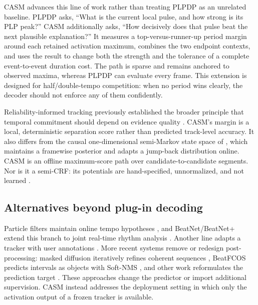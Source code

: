 \documentclass{article}
\begin{document}
CASM advances this line of work rather than treating PLPDP as an unrelated
baseline. PLPDP asks, ``What is the current local pulse, and how strong is its
PLP peak?'' CASM additionally asks, ``How decisively does that pulse beat the
next plausible explanation?'' It measures a top-versus-runner-up period margin
around each retained activation maximum, combines the two endpoint contexts,
and uses the result to change both the strength and the tolerance of a complete
event-to-event duration cost. The path is sparse and remains anchored to
observed maxima, whereas PLPDP can evaluate every frame. This extension is
designed for half/double-tempo competition: when no period wins clearly, the
decoder should not enforce any of them confidently.

Reliability-informed tracking previously established the broader principle
that temporal commitment should depend on evidence quality
\cite{degara2012reliability}. CASM's margin is a local, deterministic separation
score rather than predicted track-level accuracy. It also differs from the
causal one-dimensional semi-Markov state space of \cite{heydari2022semimarkov},
which maintains a framewise posterior and adapts a jump-back distribution
online. CASM is an offline maximum-score path over candidate-to-candidate
segments. Nor is it a semi-CRF: its potentials are hand-specified, unnormalized,
and not learned \cite{sarawagi2004semimarkov}.

\subsection{Alternatives beyond plug-in decoding}

Particle filters maintain online tempo hypotheses \cite{hainsworth2004particle},
and BeatNet/BeatNet+ extend this branch to joint real-time rhythm analysis
\cite{heydari2021beatnet,heydari2024beatnetplus}. Another line adapts a tracker
with user annotations \cite{pinto2021userdriven,maia2022adapting,
pinto2023bridging,maia2024selective,pinto2026challenging}. More recent systems
remove or redesign post-processing: masked diffusion iteratively refines
coherent sequences \cite{foscarin2026masked}, BeatFCOS predicts intervals as
objects with Soft-NMS \cite{ahn2025beatfcos}, and other work reformulates the
prediction target \cite{bolt2026reformulated}. These approaches change the
predictor or import additional supervision. CASM instead addresses the
deployment setting in which only the activation output of a frozen tracker is
available.
\end{document}
